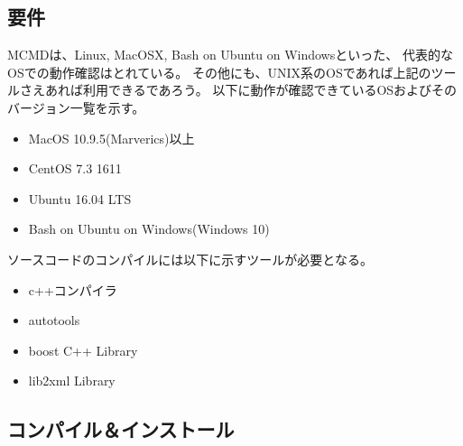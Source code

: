 \subsection{要件}
MCMDは、Linux, MacOSX, Bash on Ubuntu on Windowsといった、
代表的なOSでの動作確認はとれている。
その他にも、UNIX系のOSであれば上記のツールさえあれば利用できるであろう。
以下に動作が確認できているOSおよびそのバージョン一覧を示す。
\begin{itemize}
\item MacOS 10.9.5(Marverics)以上
\item CentOS 7.3 1611
\item Ubuntu 16.04 LTS
\item Bash on Ubuntu on Windows(Windows 10)
\end{itemize}

ソースコードのコンパイルには以下に示すツールが必要となる。
\begin{itemize}
\item c++コンパイラ
\item autotools
\item boost C++ Library
\item lib2xml Library
\end{itemize}


\subsection{コンパイル＆インストール}
